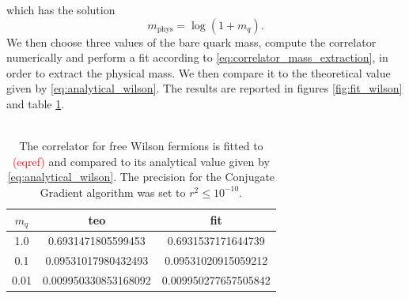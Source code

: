 which has the solution 
\begin{equation}
    m_\text{phys} = \log\left(1+m_q\right).
    \label{eq:analytical_wilson}
\end{equation}
We then choose three values of the bare quark mass, compute the correlator numerically and perform a fit according to \eqref{eq:correlator_mass_extraction}, in order to extract the physical mass. We then compare it to the theoretical value given by \eqref{eq:analytical_wilson}. The results are reported in figures \ref{fig:fit_wilson} and table \ref{tab:free_wilson_fit}. \\~\\
\begin{table}
    \centering
    \begin{tabular}[pos]{ccc}
        \toprule
        $m_q$ & teo & fit \\
        \midrule 
        1.0 & 0.6931471805599453 & 0.6931537171644739 \\
        0.1 & 0.09531017980432493 & 0.09531020915059212 \\
        0.01 & 0.009950330853168092 & 0.009950277657505842 \\
        \bottomrule
    \end{tabular}
    \caption[Fit of the correlator for free Wilson fermions.]{The correlator for free Wilson fermions is fitted to \textcolor{red}{(eqref)} and compared to its analytical value given by \eqref{eq:analytical_wilson}. The precision for the Conjugate Gradient algorithm was set to $r^2 \leq 10^{-10}$.}
    \label{tab:free_wilson_fit}
\end{table}
